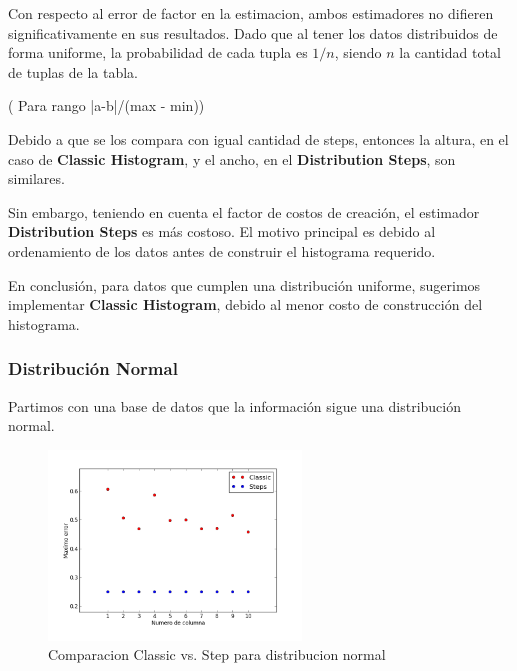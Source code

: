 \documentclass[10pt, a4paper,english,spanish,hidelinks]{article}
\begin{document}
Con respecto al error de factor en la estimacion, ambos estimadores no difieren significativamente en sus resultados. Dado que
al tener los datos distribuidos de forma uniforme, la probabilidad de cada tupla es $1/n$, siendo $n$ la cantidad total de tuplas de la tabla.

( Para rango |a-b|/(max - min))


Debido a que se los compara con igual cantidad de steps, entonces la altura, en el caso de
\textbf{Classic Histogram}, y el ancho, en el \textbf{Distribution Steps}, son similares.

Sin embargo, teniendo en cuenta el factor de costos de creación, el estimador \textbf{Distribution Steps} es más costoso.
El motivo principal es debido al ordenamiento de los datos antes de construir el histograma requerido.

En conclusión, para datos que cumplen una distribución uniforme, sugerimos implementar
\textbf{Classic Histogram}, debido al menor costo de construcción del histograma.


\subsubsection{Distribución Normal}

Partimos con una base de datos que la información sigue una distribución normal.

\begin{figure}[h!]
  \centering
  \includegraphics[width=0.6\textwidth]{./imagenes/ejb1_normal.png}
  \caption{Comparacion Classic vs. Step para distribucion normal}
\end{figure}
\end{document}
